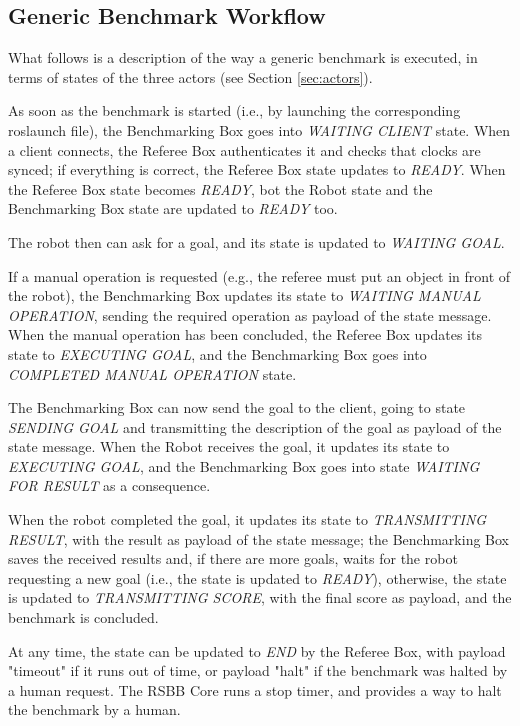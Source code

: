 \documentclass[a4paper]{article}
\begin{document}
\subsection{Generic Benchmark Workflow}

What follows is a description of the way a generic benchmark is executed, in terms of states of the three actors (see Section \ref{sec:actors}).

As soon as the benchmark is started (i.e., by launching the corresponding roslaunch file), the Benchmarking Box goes into \emph{WAITING CLIENT} state.
When a client connects, the Referee Box authenticates it and checks that clocks are synced; if everything is correct, the Referee Box state updates to \emph{READY}.
When the Referee Box state becomes \emph{READY}, bot the Robot state and the Benchmarking Box state are updated to \emph{READY} too.

The robot then can ask for a goal, and its state is updated to \emph{WAITING GOAL}.

If a manual operation is requested (e.g., the referee must put an object in front of the robot), the Benchmarking Box updates its state to \emph{WAITING MANUAL OPERATION}, sending the required operation as payload of the state message.
When the manual operation has been concluded, the Referee Box updates its state to \emph{EXECUTING GOAL}, and the Benchmarking Box goes into \emph{COMPLETED MANUAL OPERATION} state.

The Benchmarking Box can now send the goal to the client, going to state \emph{SENDING GOAL} and transmitting the description of the goal as payload of the state message.
When the Robot receives the goal, it updates its state to \emph{EXECUTING GOAL}, and the Benchmarking Box goes into state \emph{WAITING FOR RESULT} as a consequence.

When the robot completed the goal, it updates its state to \emph{TRANSMITTING RESULT}, with the result as payload of the state message; the Benchmarking Box saves the received results and, if there are more goals, waits for the robot requesting a new goal (i.e., the state is updated to \emph{READY}), otherwise, the state is updated to \emph{TRANSMITTING SCORE}, with the final score as payload, and the benchmark is concluded.

At any time, the state can be updated to \emph{END} by the Referee Box, with payload "timeout" if it runs out of time, or payload "halt" if the benchmark was halted by a human request.
The RSBB Core runs a stop timer, and provides a way to halt the benchmark by a human.
\end{document}
